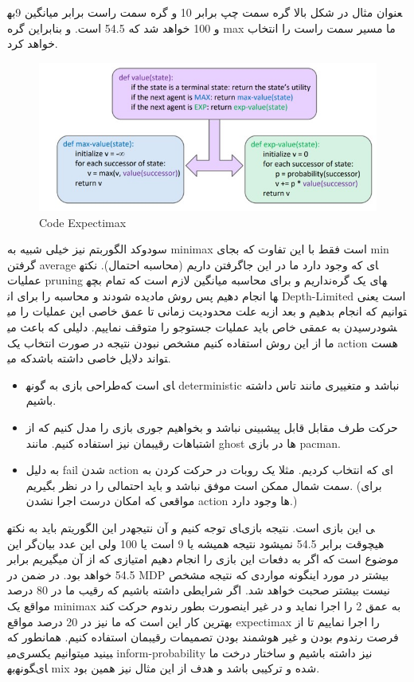 به‎عنوان مثال در شکل بالا گره سمت چپ برابر 10 و گره سمت راست برابر میانگین 9 و 100 خواهد شد که 54.5 است. و بنابراین گره max ما مسیر سمت راست را انتخاب خواهد کرد.


\begin{figure}[h!]
    \centering
    \includegraphics[width=0.8\linewidth]{images/expectimax02.jpg}
    \caption{Code Expectimax}
\end{figure}

سودوکد الگوربتم نیز خیلی شبیه به minimax است فقط با این تفاوت که بجای min گرفتن average گرفتن داریم (محاسبه احتمال).  نکته‎ای که وجود دارد ما در این جا عملیات pruning نداریم و برای محاسبه میانگین لازم است که تمام بچه‎های یک گره دیده شودند و محاسبه را برای ان‎ها انجام دهیم پس روش ما Depth-Limited است یعنی به علت محدودیت زمانی تا عمق خاصی این عملیات را می‎توانیم که انجام بدهیم و بعد از رسیدن به عمقی خاص باید عملیات جستوجو را متوقف نماییم.
دلیلی که باعث می‎شود ما از این روش استفاده کنیم مشخص نبودن نتیجه در صورت انتخاب یک action  هست که می‎تواند دلایل خاصی داشته باشد. 

\begin{itemize}
    \item
طراحی بازی به گونه‎ای است که deterministic نباشد و متغییری مانند تاس داشته باشیم.
    \item
حرکت طرف مقابل قابل پیشبینی نباشد و بخواهیم جوری بازی را مدل کنیم که از اشتباهات رقیبمان نیز استفاده کنیم. مانند ghost ها در بازی pacman.
    \item
به دلیل fail شدن action ای که انتخاب کردیم. مثلا یک روبات در حرکت کردن به سمت شمال ممکن است موفق نباشد و باید احتمالی را در نظر بگیریم. (برای مواقعی که امکان درست اجرا نشدن action ها وجود دارد.)
\end{itemize}

در این الگوریتم باید به نکته‎ای توجه کنیم و آن نتیجه‎ی این بازی است. نتیجه بازی هیچوقت برابر 54.5 نمیشود نتیجه همیشه یا 9 است یا 100 ولی این عدد بیان‌گر این موضوع است که اگر به دفعات این بازی را انجام دهیم امتیازی که از آن میگیریم برابر 54.5 خواهد بود. در ضمن در MDP بیشتر در مورد اینگونه مواردی که نتیجه مشخص نیست بیشتر صحبت خواهد شد.
اگر شرایطی داشته باشیم که رقیب ما در 80 درصد مواقع یک minimax به عمق 2 را اجرا نماید و در غیر اینصورت بطور رندوم حرکت کند بهترین کار این است که ما نیز در 20 درصد مواقع expectimax را اجرا نماییم تا از فرصت رندوم بودن و غیر هوشمند بودن تصمیمات رقیبمان استفاده کنیم. همانطور که می‎بینید میتوانیم یکسری inform-probability نیز داشته باشیم و ساختار درخت ما به‎گونه‎ای mix شده و ترکیبی باشد و هدف از این مثال نیز همین بود.

